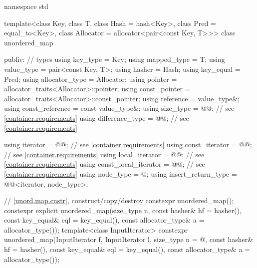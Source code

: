 %
\begin{codeblock}
namespace std {
  template<class Key,
           class T,
           class Hash = hash<Key>,
           class Pred = equal_to<Key>,
           class Allocator = allocator<pair<const Key, T>>>
  class unordered_map {
  public:
    // types
    using key_type             = Key;
    using mapped_type          = T;
    using value_type           = pair<const Key, T>;
    using hasher               = Hash;
    using key_equal            = Pred;
    using allocator_type       = Allocator;
    using pointer              = allocator_traits<Allocator>::pointer;
    using const_pointer        = allocator_traits<Allocator>::const_pointer;
    using reference            = value_type&;
    using const_reference      = const value_type&;
    using size_type            = @@; // see \ref{container.requirements}
    using difference_type      = @@; // see \ref{container.requirements}

    using iterator             = @@; // see \ref{container.requirements}
    using const_iterator       = @@; // see \ref{container.requirements}
    using local_iterator       = @@; // see \ref{container.requirements}
    using const_local_iterator = @@; // see \ref{container.requirements}
    using node_type            = @\unspec@;
    using insert_return_type   = @@<iterator, node_type>;

    // \ref{unord.map.cnstr}, construct/copy/destroy
    constexpr unordered_map();
    constexpr explicit unordered_map(size_type n, const hasher& hf = hasher(),
                                     const key_equal& eql = key_equal(),
                                     const allocator_type& a = allocator_type());
    template<class InputIterator>
      constexpr unordered_map(InputIterator f, InputIterator l,
                              size_type n = @\seebelow@, const hasher& hf = hasher(),
                              const key_equal& eql = key_equal(),
                              const allocator_type& a = allocator_type());

}}
\end{codeblock}
